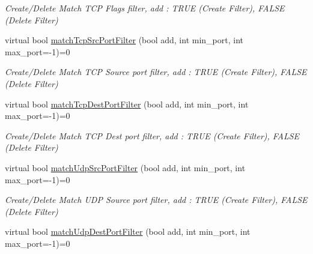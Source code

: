\begin{DoxyCompactItemize}
\begin{DoxyCompactList}\small\item\em Create/\-Delete Match T\-C\-P Flags filter, add \-: T\-R\-U\-E (Create Filter), F\-A\-L\-S\-E (Delete Filter) \end{DoxyCompactList}\item 
\hypertarget{classnxos_1_1NxPolicyEntry_ab26e1b78924fb2c42823f2da5c6d85ae}{virtual bool \hyperlink{classnxos_1_1NxPolicyEntry_ab26e1b78924fb2c42823f2da5c6d85ae}{match\-Tcp\-Src\-Port\-Filter} (bool add, int min\-\_\-port, int max\-\_\-port=-\/1)=0}\label{classnxos_1_1NxPolicyEntry_ab26e1b78924fb2c42823f2da5c6d85ae}

\begin{DoxyCompactList}\small\item\em Create/\-Delete Match T\-C\-P Source port filter, add \-: T\-R\-U\-E (Create Filter), F\-A\-L\-S\-E (Delete Filter) \end{DoxyCompactList}\item 
\hypertarget{classnxos_1_1NxPolicyEntry_ad965b8081658f9f91373072aec22ecee}{virtual bool \hyperlink{classnxos_1_1NxPolicyEntry_ad965b8081658f9f91373072aec22ecee}{match\-Tcp\-Dest\-Port\-Filter} (bool add, int min\-\_\-port, int max\-\_\-port=-\/1)=0}\label{classnxos_1_1NxPolicyEntry_ad965b8081658f9f91373072aec22ecee}

\begin{DoxyCompactList}\small\item\em Create/\-Delete Match T\-C\-P Dest port filter, add \-: T\-R\-U\-E (Create Filter), F\-A\-L\-S\-E (Delete Filter) \end{DoxyCompactList}\item 
\hypertarget{classnxos_1_1NxPolicyEntry_ac201450e77bee830f56329360972a68c}{virtual bool \hyperlink{classnxos_1_1NxPolicyEntry_ac201450e77bee830f56329360972a68c}{match\-Udp\-Src\-Port\-Filter} (bool add, int min\-\_\-port, int max\-\_\-port=-\/1)=0}\label{classnxos_1_1NxPolicyEntry_ac201450e77bee830f56329360972a68c}

\begin{DoxyCompactList}\small\item\em Create/\-Delete Match U\-D\-P Source port filter, add \-: T\-R\-U\-E (Create Filter), F\-A\-L\-S\-E (Delete Filter) \end{DoxyCompactList}\item 
\hypertarget{classnxos_1_1NxPolicyEntry_a7b9fbbc91e6050bae982a6271b2f2d34}{virtual bool \hyperlink{classnxos_1_1NxPolicyEntry_a7b9fbbc91e6050bae982a6271b2f2d34}{match\-Udp\-Dest\-Port\-Filter} (bool add, int min\-\_\-port, int max\-\_\-port=-\/1)=0}\label{classnxos_1_1NxPolicyEntry_a7b9fbbc91e6050bae982a6271b2f2d34}


\end{DoxyCompactItemize}
